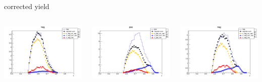 \begin{frame}{corrected yield}
\begin{columns}
\begin{column}[T]{0.25\textwidth}
\includegraphics[width = \textwidth]{results/yield/statistics_corr/yield_x_Q2_z_0.60_4.775_0.60_neg.png}
\end{column}
\begin{column}[T]{0.25\textwidth}
\includegraphics[width = \textwidth]{results/yield/statistics_corr/yield_x_Q2_z_0.60_4.775_0.70_pos.png}
\end{column}
\begin{column}[T]{0.25\textwidth}
\includegraphics[width = \textwidth]{results/yield/statistics_corr/yield_x_Q2_z_0.60_4.775_0.70_neg.png}
\end{column}
\end{columns}
\end{frame}
